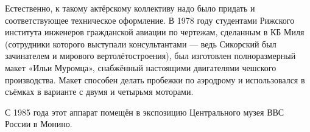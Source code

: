 Естественно, к такому актёрскому коллективу надо было придать и соответствующее
техническое оформление. В 1978 году студентами Рижского института инженеров
гражданской авиации по чертежам, сделанным в КБ Миля (сотрудники которого
выступали консультантами — ведь Сикорский был зачинателем и мирового
вертолётостроения), был изготовлен полноразмерный макет «Ильи Муромца»,
снабжённый настоящими двигателями чешского производства. Макет способен делать
пробежки по аэродрому и использовался в съёмках в варианте с двумя и четырьмя
моторами.

С 1985 года этот аппарат помещён в экспозицию Центрального музея ВВС России в
Монино.

